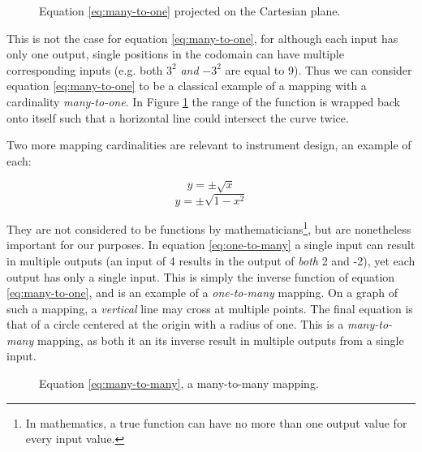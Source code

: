 \begin{figure}[h]
	\centering
\caption{Equation \ref{eq:many-to-one} projected on the Cartesian plane.}
\label{fig:many-to-one_graph}
\end{figure}

This is not the case for equation \ref{eq:many-to-one}, for although each input has only one output, single positions in the codomain can have multiple corresponding inputs (e.g. both $3^2$ \emph{and} $-3^2$ are equal to 9). Thus we can consider equation \ref{eq:many-to-one} to be a classical example of a mapping with a cardinality \emph{many-to-one}. In Figure \ref{fig:many-to-one_graph} the range of the function is wrapped back onto itself such that a horizontal line could intersect the curve twice.

Two more mapping cardinalities are relevant to instrument design, an example of each:  

\begin{equation} y = \pm\sqrt{x} \label{eq:one-to-many} \end{equation} 
\begin{equation} y = \pm\sqrt{1 - x^2} \label{eq:many-to-many} \end{equation} 

They are not considered to be functions by mathematicians\footnote{In mathematics, a true function can have no more than one output value for every input value.}, but are nonetheless important for our purposes. In equation \ref{eq:one-to-many} a single input can result in multiple outputs (an input of 4 results in the output of \emph{both} 2 and -2), yet each output has only a single input. This is simply the inverse function of equation \ref{eq:many-to-one}, and is an example of a \emph{one-to-many} mapping. On a graph of such a mapping, a \emph{vertical} line may cross at multiple points. The final equation is that of a circle centered at the origin with a radius of one. This is a \emph{many-to-many} mapping, as both it an its inverse result in multiple outputs from a single input.

\begin{figure}[ht]
	\centering
\caption{Equation \ref{eq:many-to-many}, a many-to-many mapping.}
\end{figure}

